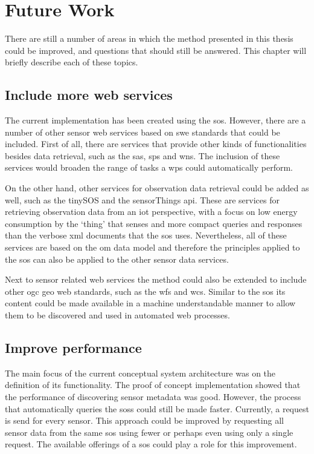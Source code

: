 
\chapter{Future Work}
\label{chap:futureResearch}

There are still a number of areas in which the method presented in this thesis could be improved, and questions that should still be answered. This chapter will briefly describe each of these topics. 

\section{Include more web services}
The current implementation has been created using the \ac{sos}. However, there are a number of other sensor web services based on \ac{swe} standards that could be included. First of all, there are services that provide other kinds of functionalities besides data retrieval, such as the \acf{sas}, \acf{sps} and \acf{wns}. The inclusion of these services would broaden the range of tasks a \ac{wps} could automatically perform. 

On the other hand, other services for observation data retrieval could be added as well, such as the tinySOS and the sensorThings \ac{api}. These are services for retrieving observation data from an \ac{iot} perspective, with a focus on low energy consumption by the `thing' that senses and more compact queries and responses than the verbose \ac{xml} documents that the \ac{sos} uses. Nevertheless, all of these services are based on the \ac{om} data model and therefore the principles applied to the \ac{sos} can also be applied to the other sensor data services.  

Next to sensor related web services the method could also be extended to include other \ac{ogc} geo web standards, such as the \acf{wfs} and \acf{wcs}. Similar to the \ac{sos} its content could be made available in a machine understandable manner to allow them to be discovered and used in automated web processes.    

\section{Improve performance}
The main focus of the current conceptual system architecture was on the definition of its functionality. The proof of concept implementation showed that the performance of discovering sensor metadata was good. However, the process that automatically queries the \aclp{sos} could still be made faster. Currently, a request is send for every sensor. This approach could be improved by requesting all sensor data from the same \ac{sos} using fewer or perhaps even using only a single request. The available offerings of a \ac{sos} could play a role for this improvement.    

